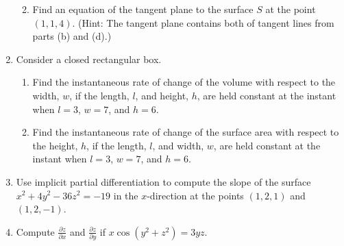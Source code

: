 \documentclass[12pt]{article}
\newif\ifans
\begin{document}
\begin{enumerate}
\begin{enumerate}
\ifans{\fbox{\parbox{1\linewidth}{There are many possible parameterizations.  One possibility is $x=1$, $y=1+t$, $z=4+6t$. Detailed Solution: \textcolor{blue}{\href{http://www.math.drexel.edu/classes/Calculus/resources/Math200HW/Solutions/10_200_Partial_14.pdf}{Here}} }}} \fi

\item Find an equation of the tangent plane to the surface $S$ at the point $(1,1,4)$. (Hint: The tangent plane contains both of tangent lines from parts (b) and (d).)

\ifans{\fbox{$-2(x-1)-6(y-1)+1(z-4)=0$; Detailed Solution: \textcolor{blue}{\href{http://www.math.drexel.edu/classes/Calculus/resources/Math200HW/Solutions/10_200_Partial_14.pdf}{Here}} }} \fi

\end{enumerate}

\item Consider a closed rectangular box.

\begin{enumerate}

\item Find the instantaneous rate of change of the volume with respect to the width, $w$, if the length, $l$, and  height, $h$, are held constant at the instant when $l=3$, $w=7$, and $h=6$.

\ifans{\fbox{18}} \fi

\item Find the instantaneous rate of change of the surface area with respect to the height, $h$, if the length, $l$, and  width, $w$, are held constant at the instant when $l=3$, $w=7$, and $h=6$.

\ifans{\fbox{20}} \fi

\end{enumerate}

\item Use implicit partial differentiation to compute the slope of the surface $x^2+4y^2-36z^2=-19$ in the $x$-direction at the points $(1,2,1)$ and $(1,2,-1)$.

\ifans{\fbox{$\left.\frac{\partial z}{\partial x}\right|_{(x,y,z)=(1,2,1)}=\frac{1}{36}$; $\left.\frac{\partial z}{\partial x}\right|_{(x,y,z)=(1,2,-1)}=-\frac{1}{36}$}} \fi

\item Compute $\frac{\partial z}{\partial x}$ and $\frac{\partial z}{\partial y}$ if $x\cos{(y^2+z^2)}=3yz$.

\ifans{\fbox{$\frac{\partial z}{\partial x}=\frac{\cos{(y^2+z^2)}}{3y+2zx\sin{(y^2+z^2)}}$; $\frac{\partial z}{\partial y}=\frac{-3z-2xy\sin{(y^2+z^2)}}{3y+2xz\sin{(y^2+z^2)}}$; Detailed Solution: \textcolor{blue}{\href{http://www.math.drexel.edu/classes/Calculus/resources/Math200HW/Solutions/10_200_Partial_17.pdf}{Here}} }} \fi


\end{enumerate}
\end{document}

